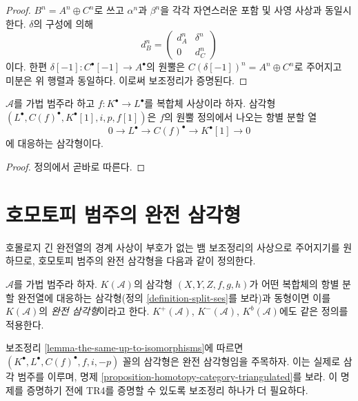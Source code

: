 \begin{proof}
$B^n = A^n \oplus C^n$로 쓰고 $\alpha^n$과 $\beta^n$을 각각 자연스러운
포함 및 사영 사상과 동일시한다. $\delta$의 구성에 의해
$$
d_B^n =
\left(
\begin{matrix}
d_A^n & \delta^n \\
0 & d_C^n
\end{matrix}
\right)
$$
이다. 한편 $\delta[-1] : C^\bullet[-1] \to A^\bullet$의 원뿔은
$C(\delta[-1])^n = A^n \oplus C^n$로 주어지고 미분은 위 행렬과
동일하다. 이로써 보조정리가 증명된다.
\end{proof}

\begin{lemma}
\label{lemma-rotate-cone}
$\mathcal{A}$를 가법 범주라 하고
$f : K^\bullet \to L^\bullet$를 복합체 사상이라 하자.
삼각형 $(L^\bullet, C(f)^\bullet, K^\bullet[1], i, p, f[1])$은
$f$의 원뿔 정의에서 나오는 항별 분할 열
$$
0 \to L^\bullet \to C(f)^\bullet \to K^\bullet[1] \to 0
$$
에 대응하는 삼각형이다.
\end{lemma}

\begin{proof}
정의에서 곧바로 따른다.
\end{proof}

\section{호모토피 범주의 완전 삼각형}
\label{section-homotopy-triangulated}

\noindent
호몰로지 긴 완전열의 경계 사상이 부호가 없는 뱀 보조정리의
사상으로 주어지기를 원하므로, 호모토피 범주의 완전 삼각형을
다음과 같이 정의한다.

\begin{definition}
\label{definition-distinguished-triangle}
$\mathcal{A}$를 가법 범주라 하자. $K(\mathcal{A})$의 삼각형
$(X, Y, Z, f, g, h)$가 어떤 복합체의 항별 분할 완전열에 대응하는
삼각형(정의 \ref{definition-split-ses}를 보라)과 동형이면 이를
$K(\mathcal{A})$의 {\it 완전 삼각형}이라고 한다.
$K^{+}(\mathcal{A})$, $K^{-}(\mathcal{A})$, $K^b(\mathcal{A})$에도
같은 정의를 적용한다.
\end{definition}

\noindent
보조정리 \ref{lemma-the-same-up-to-isomorphisms}에 따르면
$(K^\bullet, L^\bullet, C(f)^\bullet, f, i, -p)$ 꼴의 삼각형은
완전 삼각형임을 주목하자. 이는 실제로 삼각 범주를 이루며, 명제
\ref{proposition-homotopy-category-triangulated}를 보라. 이 명제를
증명하기 전에 TR4를 증명할 수 있도록 보조정리 하나가 더 필요하다.

